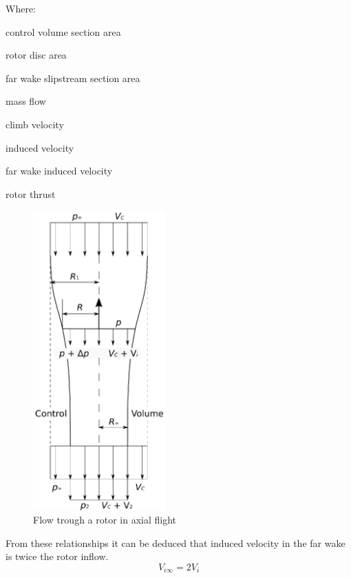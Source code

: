 Where:
\begin{description}[align=right,labelwidth=3cm]
  \item [$A_1 = \pi R_1^2$] [m\textsuperscript{2}] control volume section area
  \item [$A_R = \pi R^2$] [m\textsuperscript{2}] rotor disc area
  \item [$A_{\infty} = \pi R_{\infty}^2$] [m\textsuperscript{2}] far wake slipstream section area
  \item [$\dot m$] [kg/s] mass flow
  \item [$V_C$] [m/s] climb velocity
  \item [$V_i$] [m/s] induced velocity
  \item [$V_{i \infty}$] [m/s] far wake induced velocity
  \item [$T$] [N] rotor thrust
\end{description}

\begin{figure}[h!]
  \centering
  \includegraphics[width=51mm]{images/momentum_theory_axial.eps}
  \caption{Flow trough a rotor in axial flight}
\end{figure}

From these relationships it can be deduced that induced velocity in the far wake is twice the rotor inflow. \cite{Padfield2007}
\begin{equation}
  \label{eq-aero-indeced-vel}
  V_{i \infty} = 2 V_i
\end{equation}

